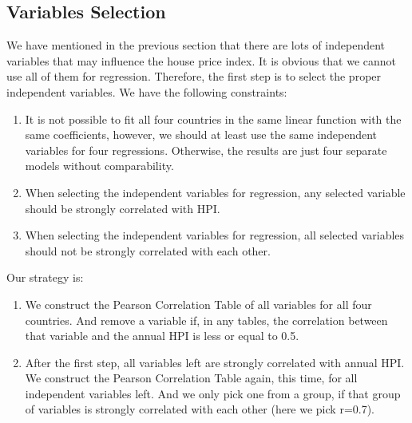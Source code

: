\documentclass[11pt]{article}
\begin{document}
\subsection{Variables Selection}\label{variables_selection}
We have mentioned in the previous section that there are lots of independent variables that may influence the house price index. It is obvious that we cannot use all of them for regression. Therefore, the first step is to select the proper independent variables. We have the following constraints:
\begin{enumerate}
    \item It is not possible to fit all four countries in the same linear function with the same coefficients, however, we should at least use the same independent variables for four regressions. Otherwise, the results are just four separate models without comparability.
    \item When selecting the independent variables for regression, any selected variable should be strongly correlated with HPI.
    \item When selecting the independent variables for regression, all selected variables should not be strongly correlated with each other.
\end{enumerate}
Our strategy is\citep{Feature}:
\begin{enumerate}
    \item We construct the Pearson Correlation Table of all variables for all four countries. And remove a variable if, in any tables, the correlation between that variable and the annual HPI is less or equal to 0.5.
    \item After the first step, all variables left are strongly correlated with annual HPI. We construct the Pearson Correlation Table again, this time, for all independent variables left. And we only pick one from a group, if that group of variables is strongly correlated with each other (here we pick r=0.7). 
\end{enumerate}
\end{document}
